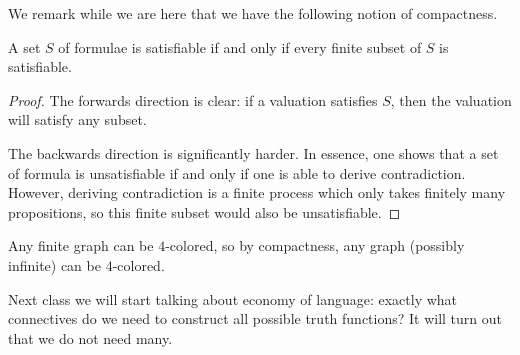We remark while we are here that we have the following notion of compactness.
\begin{theorem}[Compactness]
	A set $S$ of formulae is satisfiable if and only if every finite subset of $S$ is satisfiable.
\end{theorem}
\begin{proof}
	The forwards direction is clear: if a valuation satisfies $S$, then the valuation will satisfy any subset.

	The backwards direction is significantly harder. In essence, one shows that a set of formula is unsatisfiable if and only if one is able to derive contradiction. However, deriving contradiction is a finite process which only takes finitely many propositions, so this finite subset would also be unsatisfiable.
\end{proof}
\begin{example}
	Any finite graph can be $4$-colored, so by compactness, any graph (possibly infinite) can be $4$-colored.
\end{example}
Next class we will start talking about economy of language: exactly what connectives do we need to construct all possible truth functions? It will turn out that we do not need many.